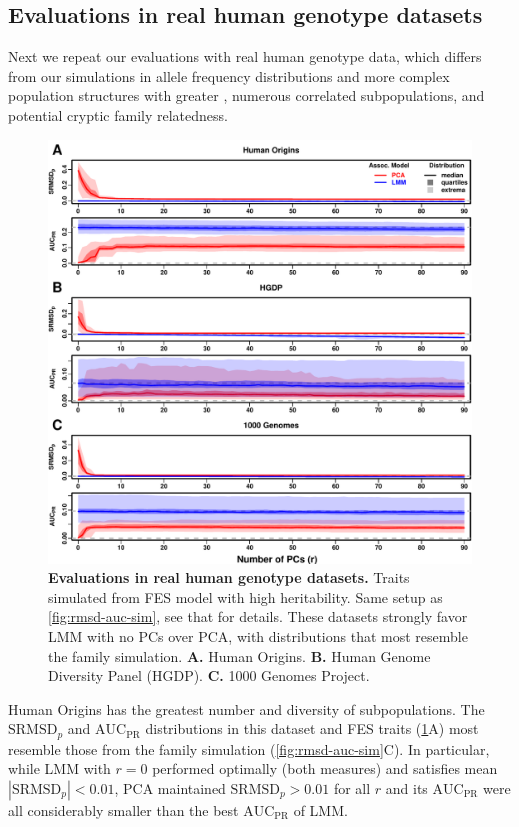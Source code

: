 \documentclass[11pt]{article}
\newcommand{\rmsd}{\text{SRMSD}_p}
\newcommand{\auc}{\text{AUC}_\text{PR}}
\begin{document}
\begin{linenumbers}
\subsection{Evaluations in real human genotype datasets}

Next we repeat our evaluations with real human genotype data, which differs from our simulations in allele frequency distributions and more complex population structures with greater \Fst, numerous correlated subpopulations, and potential cryptic family relatedness.

\begin{figure}[hp]
  \centering
  \includegraphics[width=\textwidth,height=\textheight,keepaspectratio]{fes/rmsd-auc-real.pdf}
  \caption{
    {\bf Evaluations in real human genotype datasets.}
    Traits simulated from FES model with high heritability.
    Same setup as \cref{fig:rmsd-auc-sim}, see that for details.
    These datasets strongly favor LMM with no PCs over PCA, with distributions that most resemble the family simulation.
    \textbf{A.}
    Human Origins.
    \textbf{B.}
    Human Genome Diversity Panel (HGDP).
    \textbf{C.}
    1000 Genomes Project.
  }
  \label{fig:rmsd-auc-real}
\end{figure}

Human Origins has the greatest number and diversity of subpopulations.
The $\rmsd$ and $\auc$ distributions in this dataset and FES traits (\cref{fig:rmsd-auc-real}A) most resemble those from the family simulation (\cref{fig:rmsd-auc-sim}C).
In particular, while LMM with $r=0$ performed optimally (both measures) and satisfies mean $|\rmsd| < 0.01$, PCA maintained $\rmsd > 0.01$ for all $r$ and its $\auc$ were all considerably smaller than the best $\auc$ of LMM.


\end{linenumbers}
\end{document}
